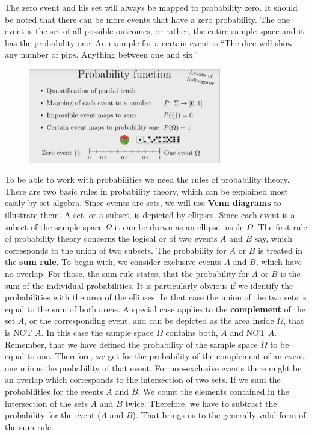 \documentclass[12pt, a4paper]{scrartcl}
\begin{document}
 The zero event and his set will always be mapped to probability zero. It should be noted that there can be more events that have a zero probability. The one event is the set of all possible outcomes, or rather, the entire sample space and it has the probability one. An example for a certain event is ``The dice will show any number of pips. Anything between one and six.” 
\begin{figure}[H]
	\centering
	\includegraphics[width=0.75\textwidth]{1_2.png}
\end{figure}
To be able to work with probabilities we need the rules of probability theory. There are two basic rules in probability theory, which can be explained most easily by set algebra.
Since events are sets, we will use \textbf{Venn diagrams} to illustrate them.
A set, or a subset, is depicted by ellipses. Since each event is a subset of the sample space $\Omega$ it can be drawn as an ellipse inside $\Omega$. The first rule of probability theory concerns the logical or of two events $A$ and $B$ say, which corresponds to the union of two subsets. The probability for $A$ or $B$ is treated in the \textbf{sum rule}. To begin with, we consider exclusive events $A$ and $B$, which have no overlap. For those, the sum rule states, that the probability for $A$ or $B$ is the sum of the individual probabilities. It is particularly obvious if we identify the probabilities with the area of the ellipses. In that case the union of the two sets is equal to the sum of both areas.
A special case applies to the \textbf{complement} of the set $A$, or the corresponding event, and can be depicted as the area inside $\Omega$, that is NOT $A$.
In this case the sample space $\Omega$ contains both, $A$ and NOT $A$. Remember, that we have defined the probability of the sample space $\Omega$ to be equal to one. Therefore, we get for the probability of the complement of an event: one minus the probability of that event.
For non-exclusive events there might be an overlap which corresponds to the intersection of two sets. If we sum the probabilities for the events $A$ and $B$. We count the elements contained in the intersection of the sets $A$ and $B$ twice. Therefore, we have to subtract the probability for the event ($A$ and $B$). That brings us to the generally valid form of the sum rule. 
\end{document}
